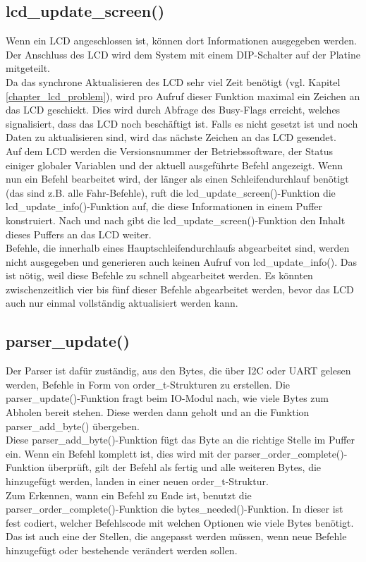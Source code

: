 \subsection{lcd\_update\_screen()}
Wenn ein LCD angeschlossen ist, können dort Informationen ausgegeben werden.
Der Anschluss des LCD wird dem System mit einem DIP-Schalter auf der Platine mitgeteilt.\\
Da das synchrone Aktualisieren des LCD sehr viel Zeit benötigt (vgl. Kapitel \ref{chapter_lcd_problem}), wird
pro Aufruf dieser Funktion maximal ein Zeichen an das LCD geschickt.
Dies wird durch Abfrage des Busy-Flags erreicht, welches signalisiert, dass das LCD noch
beschäftigt ist. Falls es nicht gesetzt ist und noch Daten zu aktualisieren sind,
wird das nächste Zeichen an das LCD gesendet.\\
Auf dem LCD werden die Versionsnummer der Betriebssoftware, der Status einiger globaler Variablen und
der aktuell ausgeführte Befehl angezeigt. Wenn nun ein Befehl bearbeitet wird, der länger als einen
Schleifendurchlauf benötigt (das sind z.B. alle Fahr-Befehle), ruft die lcd\_\-update\_\-screen()-Funktion
die lcd\_\-update\_\-info()-Funktion auf, die diese Informationen in einem Puffer konstruiert. Nach und nach
gibt die lcd\_\-update\_\-screen()-Funktion den Inhalt dieses Puffers an das LCD weiter.\\
Befehle, die innerhalb eines Hauptschleifendurchlaufs abgearbeitet sind, werden nicht ausgegeben und
generieren auch keinen Aufruf von lcd\_\-update\_\-info(). Das ist nötig, weil diese Befehle zu schnell abgearbeitet
werden. Es könnten zwischenzeitlich vier bis fünf dieser Befehle abgearbeitet werden, bevor das LCD auch nur einmal vollständig
aktualisiert werden kann.

\subsection{parser\_update()}
Der Parser ist dafür zuständig, aus den Bytes, die über I2C oder UART gelesen werden, Befehle in Form von
order\_t-Strukturen zu erstellen. Die parser\_\-update()-Funktion fragt beim IO-Modul nach, wie viele Bytes
zum Abholen bereit stehen. Diese werden dann geholt und an die Funktion parser\_\-add\_\-byte() übergeben.\\
Diese parser\_\-add\_\-byte()-Funktion fügt das Byte an die richtige Stelle im Puffer ein. Wenn ein Befehl
komplett ist, dies wird mit der parser\_\-order\_\-complete()-Funktion überprüft, gilt der Befehl als fertig und
alle weiteren Bytes, die hinzugefügt werden, landen in einer neuen order\_t-Struktur.\\
Zum Erkennen, wann ein Befehl zu Ende ist, benutzt die parser\_\-order\_\-complete()-Funktion
die bytes\_\-needed()-Funktion. In dieser ist fest codiert, welcher Befehlscode mit welchen Optionen wie viele
Bytes benötigt. Das ist auch eine der Stellen, die angepasst werden müssen, wenn neue Befehle hinzugefügt
oder bestehende verändert werden sollen.

